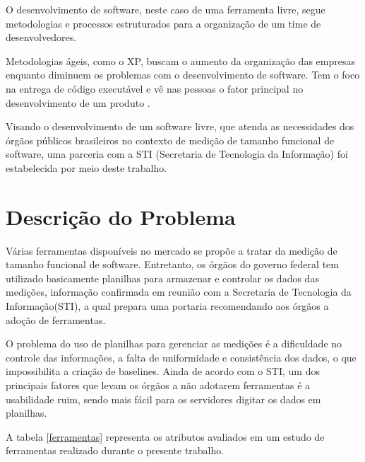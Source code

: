 O desenvolvimento de software, neste caso de uma ferramenta livre, segue metodologias e processos estruturados para a organização de um time de desenvolvedores.

Metodologias ágeis, como o XP, buscam o aumento da organização das empresas enquanto diminuem os problemas com o desenvolvimento de software. Tem o foco na entrega de código executável e vê nas pessoas o fator principal no desenvolvimento de um produto \cite{Maurer:2002}. 

Visando o desenvolvimento de um software livre, que atenda as necessidades dos órgãos públicos brasileiros no contexto de medição de tamanho funcional de software, uma parceria com a STI (Secretaria de Tecnologia da Informação) foi estabelecida por meio deste trabalho.

\section{Descrição do Problema}

Várias ferramentas disponíveis no mercado se propõe a tratar da medição de tamanho funcional de software. Entretanto, os órgãos do governo federal tem utilizado basicamente planilhas para armazenar e controlar os dados das medições, informação confirmada em reunião com a Secretaria de Tecnologia da Informação(STI), a qual prepara uma portaria recomendando aos órgãos a adoção de ferramentas.

O problema do uso de planilhas para gerenciar as medições é a dificuldade no controle das informações, a falta de uniformidade e consistência dos dados, o que impossibilita a criação de baselines. Ainda de acordo com o STI, um dos principais fatores que levam os órgãos a não adotarem ferramentas é a usabilidade ruim, sendo mais fácil para os servidores digitar os dados em planilhas.

A tabela \ref{ferramentas} representa os atributos avaliados em um estudo de ferramentas realizado durante o presente trabalho.

